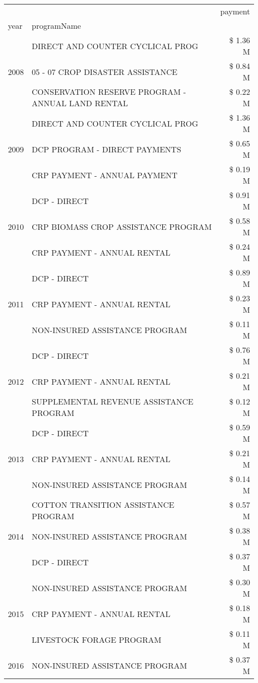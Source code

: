 \begin{tabular}{llr}
\toprule
 &  & payment \\
year & programName &  \\
\midrule
\multirow[t]{3}{*}{2008} & DIRECT AND COUNTER CYCLICAL PROG & \$ 1.36 M \\
 & 05 - 07 CROP DISASTER ASSISTANCE & \$ 0.84 M \\
 & CONSERVATION RESERVE PROGRAM - ANNUAL LAND RENTAL & \$ 0.22 M \\
\cline{1-3}
\multirow[t]{3}{*}{2009} & DIRECT AND COUNTER CYCLICAL PROG & \$ 1.36 M \\
 & DCP PROGRAM - DIRECT PAYMENTS & \$ 0.65 M \\
 & CRP PAYMENT - ANNUAL PAYMENT & \$ 0.19 M \\
\cline{1-3}
\multirow[t]{3}{*}{2010} & DCP - DIRECT & \$ 0.91 M \\
 & CRP BIOMASS CROP ASSISTANCE PROGRAM & \$ 0.58 M \\
 & CRP PAYMENT - ANNUAL RENTAL & \$ 0.24 M \\
\cline{1-3}
\multirow[t]{3}{*}{2011} & DCP - DIRECT & \$ 0.89 M \\
 & CRP PAYMENT - ANNUAL RENTAL & \$ 0.23 M \\
 & NON-INSURED ASSISTANCE PROGRAM & \$ 0.11 M \\
\cline{1-3}
\multirow[t]{3}{*}{2012} & DCP - DIRECT & \$ 0.76 M \\
 & CRP PAYMENT - ANNUAL RENTAL & \$ 0.21 M \\
 & SUPPLEMENTAL REVENUE ASSISTANCE PROGRAM & \$ 0.12 M \\
\cline{1-3}
\multirow[t]{3}{*}{2013} & DCP - DIRECT & \$ 0.59 M \\
 & CRP PAYMENT - ANNUAL RENTAL & \$ 0.21 M \\
 & NON-INSURED ASSISTANCE PROGRAM & \$ 0.14 M \\
\cline{1-3}
\multirow[t]{3}{*}{2014} & COTTON TRANSITION ASSISTANCE PROGRAM & \$ 0.57 M \\
 & NON-INSURED ASSISTANCE PROGRAM & \$ 0.38 M \\
 & DCP - DIRECT & \$ 0.37 M \\
\cline{1-3}
\multirow[t]{3}{*}{2015} & NON-INSURED ASSISTANCE PROGRAM & \$ 0.30 M \\
 & CRP PAYMENT - ANNUAL RENTAL & \$ 0.18 M \\
 & LIVESTOCK FORAGE PROGRAM & \$ 0.11 M \\
\cline{1-3}
\multirow[t]{3}{*}{2016} & NON-INSURED ASSISTANCE PROGRAM & \$ 0.37 M \\

\end{tabular}
